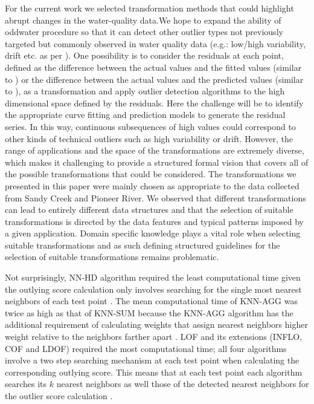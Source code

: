 \documentclass[draft]{agujournal2018} %
\begin{document}
\color{black}
For the current work we selected
transformation methods that could highlight  abrupt changes in the
water-quality data.We hope to expand the ability of oddwater procedure  so that it can
detect other outlier types not previously targeted but commonly observed
in water quality data \color{black} (e.g.: low/high variability, drift etc. as per \citet{leigh2019framework}). One possibility is to consider the residuals
at each point, defined as the difference between the actual values and
the fitted values (similar to \citet{schwarz2008wind}) or the
difference between the actual values and the predicted values (similar
to \citet{hill2006automated}), as a transformation and apply outlier
detection algorithms to the high dimensional space defined by the residuals.
Here the challenge will be to identify the appropriate curve fitting and
prediction models to generate the residual series. In this way,
continuous subsequences of high values could correspond to other kinds of technical outliers such as high variability or drift. However, the range of applications and the space of the transformations are extremely diverse, which makes it challenging to provide a structured
formal vision that covers all of the possible transformations that could be considered. The transformations we presented in this paper were mainly  chosen  as appropriate to the data collected from Sandy Creek and Pioneer River.
We observed that different transformations can lead to entirely different data structures and that the selection of suitable transformations is directed by the data features and typical patterns imposed by a given application. Domain specific knowledge plays a vital role when selecting suitable transformations and as such defining structured guidelines
for the selection of suitable transformations remains problematic.
\color{black}

Not surprisingly, \color{black} NN-HD \color{black} algorithm required the least computational
time given the outlying score calculation only involves searching for
the single most nearest neighbors of each test point
\citep{wilkinsonvisualizing}. The mean computational time of KNN-AGG
was twice as high as that of KNN-SUM because the KNN-AGG algorithm has
the additional requirement of calculating weights that assign nearest
neighbors higher weight relative to the neighbors farther apart
\citep{angiulli2002fast}. LOF and its extensions (INFLO, COF and
LDOF) required the most computational time; all four algorithms involve
a two step searching mechanism at each test point when calculating the
corresponding outlying score. This means that at each test point each
algorithm searches its \(k\) nearest neighbors as well those of the
detected nearest neighbors for the outlier score calculation
\citep{breunig2000lof,tang2002enhancing,jin2006ranking,zhang2009new}.
\end{document}
